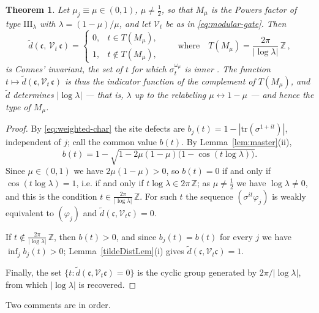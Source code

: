 \documentclass[twoside,11pt,letter]{article}
\def\bZ{\mathbb{Z}}
\def\cV{{\mathcal{V}}}
\def\fc{{\mathfrak{c}}}
\newcommand{\tr}{\mathrm{tr}}
\newtheorem{theorem}{Theorem}[section]
\theoremstyle{definition}
\theoremstyle{definition}
\theoremstyle{plain}
\begin{document}
\begin{theorem}
\label{thm:connesT}
Let $\mu_j \equiv \mu \in (0,1)$, $\mu \neq \tfrac12$, so that $M_\mu$ is the Powers factor of type $\mathrm{III}_\lambda$ with $\lambda = (1-\mu)/\mu$, and let $\cV_t$ be as in \eqref{eq:modular-gate}. Then
\begin{equation}
\label{eq:connesT}
\tilde d ( \fc,\, \cV_t\,\fc )
=
\begin{cases}
0, & t \in T(M_\mu), \\[2pt]
1, & t \notin T(M_\mu),
\end{cases}
\qquad\text{where}\quad
T(M_\mu) = \frac{2\pi}{|\log \lambda|}\, \bZ\,,
\end{equation}
is Connes' invariant, the set of $t$ for which $\sigma^{\omega_\mu}_t$ is inner \cite{C73}. The function $t \mapsto \tilde d(\fc, \cV_t\,\fc)$ is thus the indicator function of the complement of $T(M_\mu)$, and $\tilde d$ determines $|\log\lambda|$ --- that is, $\lambda$ up to the relabeling $\mu \leftrightarrow 1-\mu$ --- and hence the type of $M_\mu$.
\end{theorem}

\begin{proof}
By \eqref{eq:weighted-char} the site defects are $b_j(t) = 1 - |\tr(\sigma^{1+it})|$, independent of $j$; call the common value $b(t)$. By Lemma~\ref{lem:master}(ii),
\begin{equation*}
b(t) = 1 - \sqrt{ 1 - 2\mu(1-\mu)\bigl( 1 - \cos(t \log \lambda)
\bigr) } .
\end{equation*}
Since $\mu \in (0,1)$ we have $2\mu(1-\mu) > 0$, so $b(t) = 0$ if and only if $\cos(t\log\lambda) = 1$, i.e. if and only if $t \log \lambda \in 2\pi\, \bZ$; as $\mu \neq \tfrac12$ we have $\log\lambda \neq 0$, and this is the condition $t \in \frac{2\pi}{|\log\lambda|}\,\bZ$. For such $t$ the sequence $(\sigma^{it}\varphi_j)$ is weakly equivalent to $(\varphi_j)$ and $\tilde d(\fc, \cV_t\fc) = 0$.

If $t \notin \frac{2\pi}{|\log\lambda|}\,\bZ$, then $b(t) > 0$, and since $b_j(t) = b(t)$ for every $j$ we have $\inf_j b_j(t) > 0$; Lemma~\ref{tildeDistLem}(i)
gives $\tilde d(\fc, \cV_t\fc) = 1$.

Finally, the set $\{ t : \tilde d(\fc,\cV_t\fc) = 0 \}$ is the cyclic group generated by $2\pi/|\log\lambda|$, from which $|\log\lambda|$ is recovered.
\end{proof}

Two comments are in order.
\end{document}

